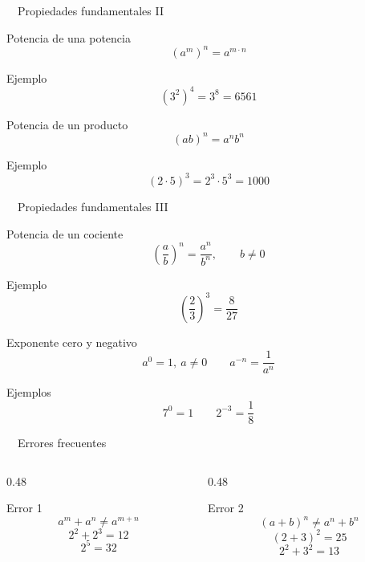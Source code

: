 \documentclass[aspectratio=169,10pt,handout]{beamer}
\newcommand{\pp}{\pause}
\newcommand{\iconoDesarrollo}{\faBrain}
\newcommand{\iconoError}{\faExclamationTriangle}
\begin{document}
	\begin{frame}{\iconoDesarrollo\ \ Propiedades fundamentales II}
		\begin{block}{Potencia de una potencia}
			\[
			(a^m)^n=a^{m\cdot n}
			\]
		\end{block}
		\begin{exampleblock}{Ejemplo}
			\[
			(3^2)^4=3^8=6561
			\]
		\end{exampleblock}
		
		\pp
		
		\begin{block}{Potencia de un producto}
			\[
			(ab)^n=a^n b^n
			\]
		\end{block}
		\begin{exampleblock}{Ejemplo}
			\[
			(2\cdot5)^3=2^3\cdot5^3=1000
			\]
		\end{exampleblock}
	\end{frame}
	
	\begin{frame}{\iconoDesarrollo\ \ Propiedades fundamentales III}
		\begin{block}{Potencia de un cociente}
			\[
			\left(\frac{a}{b}\right)^n=\frac{a^n}{b^n},\qquad b\neq0
			\]
		\end{block}
		\begin{exampleblock}{Ejemplo}
			\[
			\left(\frac{2}{3}\right)^3=\frac{8}{27}
			\]
		\end{exampleblock}
		
		\pp
		
		\begin{block}{Exponente cero y negativo}
			\[
			a^0=1,\ a\neq0
			\qquad
			a^{-n}=\frac{1}{a^n}
			\]
		\end{block}
		\begin{exampleblock}{Ejemplos}
			\[
			7^0=1
			\qquad
			2^{-3}=\frac{1}{8}
			\]
		\end{exampleblock}
	\end{frame}
	
	\begin{frame}{\iconoError\ \ Errores frecuentes}
		\begin{columns}[T,totalwidth=\textwidth]
			\begin{column}{0.48\textwidth}
				\begin{alertblock}{Error 1}
					\[
					a^m+a^n \neq a^{m+n}
					\]
					\[
					2^2+2^3=12
					\]
					\[
					2^5=32
					\]
				\end{alertblock}
			\end{column}
			\begin{column}{0.48\textwidth}
				\begin{alertblock}{Error 2}
					\[
					(a+b)^n \neq a^n+b^n
					\]
					\[
					(2+3)^2=25
					\]
					\[
					2^2+3^2=13
					\]
				\end{alertblock}
			\end{column}
		\end{columns}
	\end{frame}
	
\end{document}
